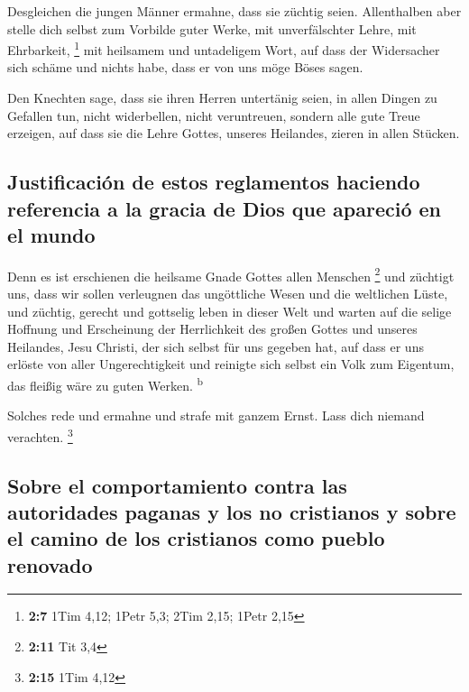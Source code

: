  Desgleichen die jungen Männer ermahne, dass sie züchtig
seien.  Allenthalben aber stelle dich selbst zum Vorbilde
guter Werke, mit unverfälschter Lehre, mit Ehrbarkeit, \footnote{\textbf{2:7}
  1Tim 4,12; 1Petr 5,3; 2Tim 2,15; 1Petr 2,15}  mit
heilsamem und untadeligem Wort, auf dass der Widersacher sich schäme und
nichts habe, dass er von uns möge Böses sagen.

 Den Knechten sage, dass sie ihren Herren untertänig
seien, in allen Dingen zu Gefallen tun, nicht widerbellen,
 nicht veruntreuen, sondern alle gute Treue erzeigen, auf
dass sie die Lehre Gottes, unseres Heilandes, zieren in allen Stücken.

\hypertarget{justificaciuxf3n-de-estos-reglamentos-haciendo-referencia-a-la-gracia-de-dios-que-apareciuxf3-en-el-mundo}{%
\subsection{Justificación de estos reglamentos haciendo referencia a la
gracia de Dios que apareció en el
mundo}\label{justificaciuxf3n-de-estos-reglamentos-haciendo-referencia-a-la-gracia-de-dios-que-apareciuxf3-en-el-mundo}}

 Denn es ist erschienen die heilsame Gnade Gottes allen
Menschen \footnote{\textbf{2:11} Tit 3,4}  und züchtigt
uns, dass wir sollen verleugnen das ungöttliche Wesen und die weltlichen
Lüste, und züchtig, gerecht und gottselig leben in dieser Welt
 und warten auf die selige Hoffnung und Erscheinung der
Herrlichkeit des großen Gottes und unseres Heilandes, Jesu Christi,
 der sich selbst für uns gegeben hat, auf dass er uns
erlöste von aller Ungerechtigkeit und reinigte sich selbst ein Volk zum
Eigentum, das fleißig wäre zu guten Werken. \textsuperscript{b}

 Solches rede und ermahne und strafe mit ganzem Ernst.
Lass dich niemand verachten. \footnote{\textbf{2:15} 1Tim 4,12}

\hypertarget{sobre-el-comportamiento-contra-las-autoridades-paganas-y-los-no-cristianos-y-sobre-el-camino-de-los-cristianos-como-pueblo-renovado}{%
\subsection{Sobre el comportamiento contra las autoridades paganas y los
no cristianos y sobre el camino de los cristianos como pueblo
renovado}\label{sobre-el-comportamiento-contra-las-autoridades-paganas-y-los-no-cristianos-y-sobre-el-camino-de-los-cristianos-como-pueblo-renovado}}

